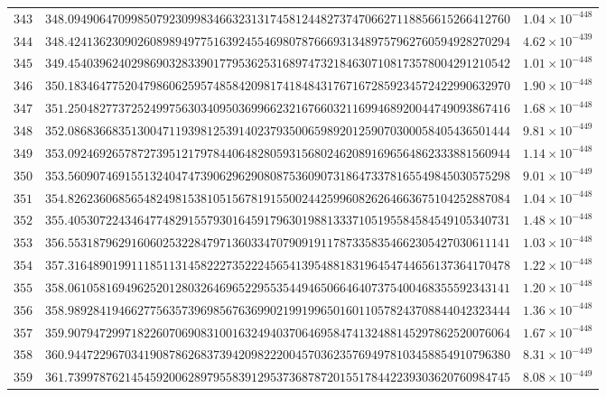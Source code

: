 \documentclass[12pt,reqno]{amsart}
\theoremstyle{remark}
\begin{document}
\begin{longtable}{clc}
$343$ & $348.0949064709985079230998346632313174581244827374706627118856615266412760$ & $1.04\times 10^{-448}$ \\
$344$ & $348.4241362309026089894977516392455469807876669313489757962760594928270294$ & $4.62\times 10^{-439}$ \\
$345$ & $349.4540396240298690328339017795362531689747321846307108173578004291210542$ & $1.01\times 10^{-448}$ \\
$346$ & $350.1834647752047986062595748584209817418484317671672859234572422990632970$ & $1.90\times 10^{-448}$ \\
$347$ & $351.2504827737252499756303409503699662321676603211699468920044749093867416$ & $1.68\times 10^{-448}$ \\
$348$ & $352.0868366835130047119398125391402379350065989201259070300058405436501444$ & $9.81\times 10^{-449}$ \\
$349$ & $353.0924692657872739512179784406482805931568024620891696564862333881560944$ & $1.14\times 10^{-448}$ \\
$350$ & $353.5609074691551324047473906296290808753609073186473378165549845030575298$ & $9.01\times 10^{-449}$ \\
$351$ & $354.8262360685654824981538105156781915500244259960826264663675104252887084$ & $1.04\times 10^{-448}$ \\
$352$ & $355.4053072243464774829155793016459179630198813337105195584584549105340731$ & $1.48\times 10^{-448}$ \\
$353$ & $356.5531879629160602532284797136033470790919117873358354662305427030611141$ & $1.03\times 10^{-448}$ \\
$354$ & $357.3164890199111851131458222735222456541395488183196454744656137364170478$ & $1.22\times 10^{-448}$ \\
$355$ & $358.0610581694962520128032646965229553544946506646407375400468355592343141$ & $1.20\times 10^{-448}$ \\
$356$ & $358.9892841946627756357396985676369902199199650160110578243708844042323444$ & $1.36\times 10^{-448}$ \\
$357$ & $359.9079472997182260706908310016324940370646958474132488145297862520076064$ & $1.67\times 10^{-448}$ \\
$358$ & $360.9447229670341908786268373942098222004570362357694978103458854910796380$ & $8.31\times 10^{-449}$ \\
$359$ & $361.7399787621454592006289795583912953736878720155178442239303620760984745$ & $8.08\times 10^{-449}$ \\

\end{longtable}
\end{document}
